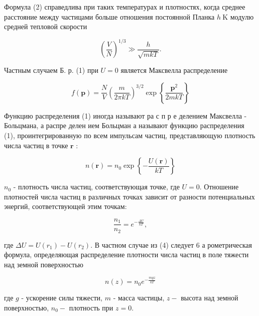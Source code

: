 \documentclass[10pt]{article}
\begin{document}
Формула (2) справедлива при таких температурах и плотностях, когда среднее расстояние между частицами больше отношения постоянной Планка $h \mathrm{~K}$ модулю средней тепловой скорости



\[

\left(\frac{V}{N}\right)^{1 / 3} \gg \frac{h}{\sqrt{m k T}} .

\]



Частным случаем Б. р. (1) при $U=0$ является Максвелла распределение



\[

f(\boldsymbol{p})=\frac{N}{V}\left(\frac{m}{2 \pi k T}\right)^{3 / 2} \exp \left\{\frac{\boldsymbol{p}^{2}}{2 m k T}\right\}

\]



Функцию распределения (1) иногда называют ра с п р е делением Максвелла - Больцмана, а распре делен ием Больцман а называют функцию распределения (1), проинтегрированную по всем импульсам частиц, представляющую плотность числа частиц в точке $\boldsymbol{r}$ :



\[

n(\boldsymbol{r})=n_{0} \exp \left\{-\frac{U(\boldsymbol{r})}{k T}\right\}

\]



$n_{0}$ - плотность числа частиц, соответствующая точке, где $U=0$. Отношение плотностей числа частиц в различных точках зависит от разности потенциальных энергий, соответствующей этим точкам:



\[

\frac{n_{1}}{n_{2}}=e^{-\frac{\Delta U}{k T}},

\]



где $\Delta U=U\left(r_{1}\right)-U\left(r_{2}\right)$. В частном случае из (4) следует 6 а рометрическая формула, определяющая распределение плотности числа частиц в поле тяжести над земной поверхностью



\[

n(z)=n_{0} e^{-\frac{m g z}{k T}}

\]



где $g$ - ускорение силы тяжести, $m$ - масса частицы, $z-$ высота над земной поверхностью, $n_{0}-$ плотность при $z=0$.
\end{document}
